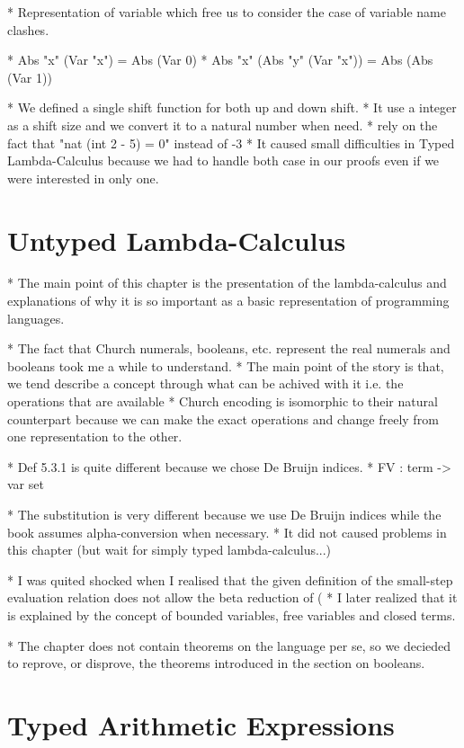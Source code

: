 \documentclass[a4paper, oneside, 12pt, titlepage]{article}
\begin{document}
  * Representation of variable which free us to consider the case of variable name clashes.

  * Abs "x" (Var "x") = Abs (Var 0)
  * Abs "x" (Abs "y" (Var "x")) = Abs (Abs (Var 1))

  * We defined a single shift function for both up and down shift.
    * It use a integer as a shift size and we convert it to a natural number when need.
      * rely on the fact that "nat (int 2 - 5) = 0" instead of -3
    * It caused small difficulties in Typed Lambda-Calculus because we had to handle both case in
      our proofs even if we were interested in only one.

\section{Untyped Lambda-Calculus}
\label{sec:untyped-lambda-calculus}

  * The main point of this chapter is the presentation of the lambda-calculus and explanations of
    why it is so important as a basic representation of programming languages.

  * The fact that Church numerals, booleans, etc. represent the real numerals and booleans took me a
    while to understand.
    * The main point of the story is that, we tend describe a concept through what can be achived
      with it i.e. the operations that are available
    * Church encoding is isomorphic to their natural counterpart because we can make the exact
      operations and change freely from one representation to the other.

  * Def 5.3.1 is quite different because we chose De Bruijn indices.
    * FV : term -> var set

  * The substitution is very different because we use De Bruijn indices while the book assumes
    alpha-conversion when necessary.
    * It did not caused problems in this chapter (but wait for simply typed lambda-calculus...)

  * I was quited shocked when I realised that the given definition of the small-step evaluation
    relation does not allow the beta reduction of (%
    * I later realized that it is explained by the concept of bounded variables, free variables and
      closed terms.

  * The chapter does not contain theorems on the language per se, so we decieded to reprove, or
    disprove, the theorems introduced in the section on booleans.

\section{Typed Arithmetic Expressions}
\label{sec:typed-arith-expr}
\end{document}
